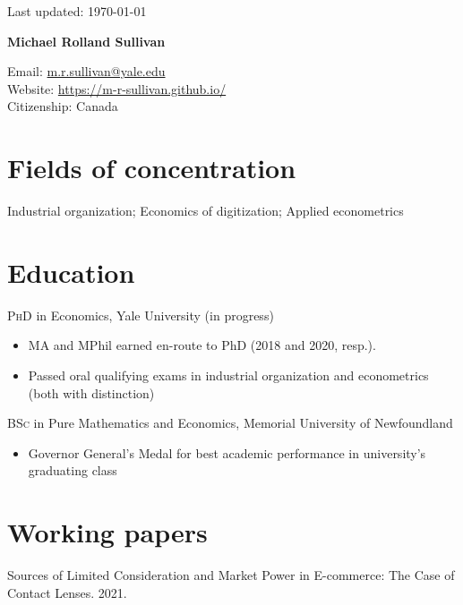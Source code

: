 \documentclass[11pt]{article} %
\begin{document}
 \begin{flushright}
   \scriptsize
	Last updated: \today
   \normalsize
\end{flushright}
{\LARGE\bfseries Michael Rolland Sullivan} %
\bigskip\bigskip\medskip %

\medskip %

Email: \href{mailto:m.r.sullivan@yale.edu}{m.r.sullivan@yale.edu}\\ 
Website: \href{https://m-r-sullivan.github.io/}{https://m-r-sullivan.github.io/}\\ 

Citizenship: Canada 

\section*{Fields of concentration}

Industrial organization; Economics of digitization; Applied econometrics 

\section*{Education}

\textsc{PhD} in Economics, Yale University (in progress)
\begin{itemize}
	\item MA and MPhil earned en-route to PhD (2018 and 2020, resp.).
	\item Passed oral qualifying exams in industrial organization and econometrics (both with distinction)
\end{itemize}

\textsc{BSc} in Pure Mathematics and Economics, Memorial University of Newfoundland
\begin{itemize}
	\item Governor General's Medal for best academic performance in university's graduating class
\end{itemize}

\section*{Working papers}

Sources of Limited Consideration and Market Power in E-commerce: The Case of
Contact Lenses. 2021.
\end{document}
